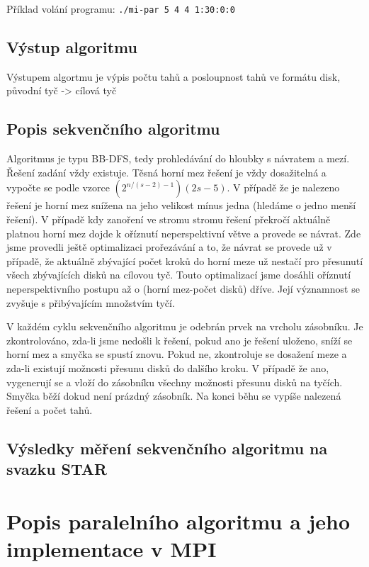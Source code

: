 \documentclass[12pt]{article}
\begin{document}
Příklad volání programu:
\texttt{./mi-par 5 4 4 1:30:0:0}

\subsection{Výstup algoritmu}
Výstupem algortmu je výpis počtu tahů a posloupnost tahů ve formátu disk, původní tyč -> cílová tyč

\subsection{Popis sekvenčního algoritmu}
Algoritmus je typu BB-DFS, tedy prohledávání do hloubky s návratem a mezí. Řešení zadání vždy existuje. Těsná horní mez řešení je vždy dosažitelná a vypočte se podle vzorce $(2^{n/(s-2)-1})(2s-5)$. V případě že je nalezeno řešení je horní mez snížena na jeho velikost mínus jedna (hledáme o jedno menší řešení). V případě kdy zanoření ve stromu stromu řešení překročí aktuálně platnou horní mez dojde k oříznutí neperspektivní větve a provede se návrat. Zde jsme provedli ještě optimalizaci prořezávání a to, že návrat se provede už v případě, že aktuálně zbývající počet kroků do horní meze už nestačí pro přesunutí všech zbývajících disků na cílovou tyč. Touto optimalizací jsme dosáhli oříznutí neperspektivního postupu až o (horní mez-počet disků) dříve. Její významnost se zvyšuje s přibývajícím množstvím tyčí.

V každém cyklu sekvenčního algoritmu je odebrán prvek na vrcholu zásobníku. Je zkontrolováno, zda-li jsme nedošli k řešení, pokud ano je řešení uloženo, sníží se horní mez a smyčka se spustí znovu. Pokud ne, zkontroluje se dosažení meze a zda-li existují možnosti přesunu disků do dalšího kroku. V případě že ano, vygenerují se  a vloží do zásobníku všechny možnosti přesunu disků na tyčích. Smyčka běží dokud není prázdný zásobník. Na konci běhu se vypíše nalezená řešení a počet tahů.

\subsection{Výsledky měření sekvenčního algoritmu na svazku STAR}



\section{Popis paralelního algoritmu a jeho implementace v MPI}
\end{document}
